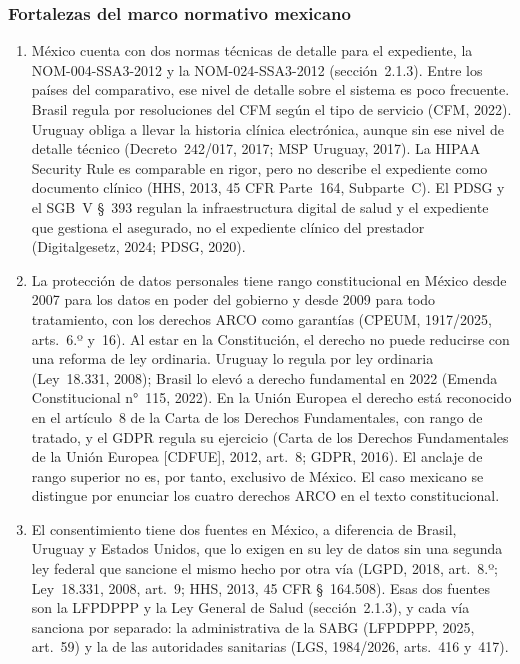 \documentclass[12pt, a4paper]{article}
\begin{document}
\subsubsection{Fortalezas del marco normativo mexicano}
\begin{enumerate}[label=\Roman*.]
 
 \item México cuenta con dos normas técnicas de detalle para el
  expediente, la NOM-004-SSA3-2012 y la NOM-024-SSA3-2012 (sección~2.1.3). Entre los países del comparativo, ese nivel de
  detalle sobre el sistema es poco frecuente. Brasil regula por
  resoluciones del CFM según el tipo de servicio (CFM, 2022). Uruguay
  obliga a llevar la historia clínica electrónica, aunque sin ese nivel de
  detalle técnico (Decreto~242/017, 2017; MSP Uruguay, 2017). La HIPAA
  Security Rule es comparable en rigor,
  pero no describe el expediente como documento clínico (HHS, 2013,
  45 CFR Parte~164, Subparte~C). El PDSG y el SGB~V \S~393 regulan
  la infraestructura digital de salud y el expediente que gestiona el asegurado, no el expediente clínico del prestador (Digitalgesetz,
  2024; PDSG, 2020).
 
  \item La protección de datos personales tiene rango
  constitucional en México desde 2007 para los datos en poder del
  gobierno y desde 2009 para todo tratamiento, con los derechos ARCO
  como garantías (CPEUM, 1917/2025, arts.~6.º y~16). Al estar en la
  Constitución, el derecho no puede reducirse con una reforma de
  ley ordinaria. Uruguay lo regula por ley ordinaria (Ley~18.331,
  2008); Brasil lo elevó a derecho fundamental en 2022 (Emenda
  Constitucional n°~115, 2022). En la Unión Europea el derecho está
  reconocido en el artículo~8 de la Carta de los Derechos
  Fundamentales, con rango de tratado, y el GDPR regula su ejercicio
  (Carta de los Derechos Fundamentales de la Unión Europea [CDFUE],
  2012, art.~8; GDPR, 2016). El anclaje de rango superior no es, por
  tanto, exclusivo de México. El caso mexicano se distingue por
  enunciar los cuatro derechos ARCO en el texto
  constitucional.
 
  \item El consentimiento tiene dos fuentes en México, a diferencia
  de Brasil, Uruguay y Estados Unidos, que lo exigen en su ley de
  datos sin una segunda ley federal que sancione el mismo hecho por
  otra vía (LGPD, 2018, art.~8.º; Ley~18.331, 2008, art.~9; HHS,
  2013, 45 CFR \S~164.508). Esas dos fuentes son la
  LFPDPPP y la Ley General de Salud (sección~2.1.3),
  y cada
  vía sanciona por separado: la administrativa de la SABG (LFPDPPP,
  2025, art.~59) y la de las autoridades sanitarias (LGS, 1984/2026,
  arts.~416 y~417).
 

\end{enumerate}
\end{document}
